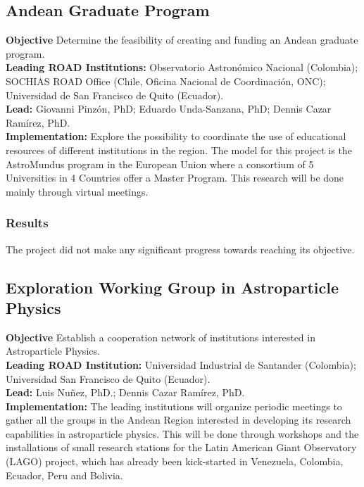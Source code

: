 

\subsection{Andean Graduate Program}
\textbf{Objective} Determine the feasibility of creating and funding
an Andean graduate program. 
\\
\textbf{Leading ROAD Institutions:} Observatorio Astronómico Nacional
(Colombia); SOCHIAS ROAD Office (Chile, Oficina Nacional de
Coordinación, ONC); Universidad de San Francisco de Quito (Ecuador). 
\\
\textbf{Lead:} Giovanni Pinzón, PhD; Eduardo Unda-Sanzana, PhD;
Dennis Cazar Ramírez, PhD.   
\\
\textbf{Implementation:} Explore the possibility to coordinate the use
of educational resources of different institutions in the region. The
model for this project is the AstroMundus program in the European
Union where a consortium of 5 Universities in 4 Countries offer a
Master Program. This research will be done mainly through virtual
meetings.  


\subsubsection{Results}
The project  did not make any significant progress towards reaching its
objective.  



\subsection{Exploration Working Group in Astroparticle Physics}
\textbf{Objective} Establish a cooperation network of institutions
interested in Astroparticle Physics. 
\\
\textbf{Leading ROAD Institution:} Universidad Industrial de Santander (Colombia); Universidad San Francisco de Quito (Ecuador). 
\\
\textbf{Lead:} Luis Nuñez, PhD.; Dennis Cazar Ramírez, PhD.
\\
\textbf{Implementation:} The leading institutions will organize
periodic meetings to gather all the groups in the Andean Region
interested in developing its research capabilities in astroparticle
physics. This will be done through workshops and the installations of
small research stations for the Latin American Giant Observatory
(LAGO) project, which has already been kick-started in Venezuela,
Colombia, Ecuador, Peru and Bolivia. 

